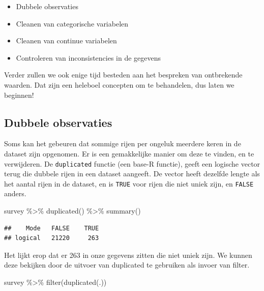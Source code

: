 \documentclass[]{tufte-book}
\newenvironment{Shaded}{}{}
\newcommand{\FunctionTok}[1]{\textcolor[rgb]{0.02,0.16,0.49}{#1}}
\newcommand{\NormalTok}[1]{#1}
\newcommand{\SpecialCharTok}[1]{\textcolor[rgb]{0.25,0.44,0.63}{#1}}
\providecommand{\tightlist}{%
  \setlength{\itemsep}{0pt}\setlength{\parskip}{0pt}}
\begin{document}
\begin{itemize}
\tightlist
\item
  Dubbele observaties
\item
  Cleanen van categorische variabelen
\item
  Cleanen van continue variabelen
\item
  Controleren van inconsistencies in de gegevens
\end{itemize}

Verder zullen we ook enige tijd besteden aan het bespreken van ontbrekende waarden. Dat zijn een heleboel concepten om te behandelen, dus laten we beginnen!

\hypertarget{dubbele-observaties}{%
\subsection{Dubbele observaties}\label{dubbele-observaties}}

Soms kan het gebeuren dat sommige rijen per ongeluk meerdere keren in de dataset zijn opgenomen. Er is een gemakkelijke manier om deze te vinden, en te verwijderen.
De \texttt{duplicated} functie (een base-R functie), geeft een logische vector terug die dubbele rijen in een dataset aangeeft. De vector heeft dezelfde lengte als het aantal rijen in de dataset, en is \texttt{TRUE} voor rijen die niet uniek zijn, en \texttt{FALSE} anders.

\begin{Shaded}
\begin{Highlighting}[]
\NormalTok{survey }\SpecialCharTok{\%\textgreater{}\%}
  \FunctionTok{duplicated}\NormalTok{() }\SpecialCharTok{\%\textgreater{}\%}
  \FunctionTok{summary}\NormalTok{()}
\end{Highlighting}
\end{Shaded}

\begin{verbatim}
##    Mode   FALSE    TRUE 
## logical   21220     263
\end{verbatim}

Het lijkt erop dat er 263 in onze gegevens zitten die niet uniek zijn. We kunnen deze bekijken door de uitvoer van duplicated te gebruiken als invoer van filter.

\begin{Shaded}
\begin{Highlighting}[]
\NormalTok{survey }\SpecialCharTok{\%\textgreater{}\%}
  \FunctionTok{filter}\NormalTok{(}\FunctionTok{duplicated}\NormalTok{(.))}
\end{Highlighting}
\end{Shaded}
\end{document}
